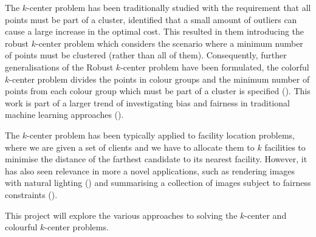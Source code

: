 The $k$-center problem has been traditionally studied with the requirement that all points must be part of a cluster, \textcite{charikar_algorithms_2001} identified that a small amount of outliers can cause a large increase in the optimal cost. This resulted in them introducing the robust $k$-center problem which considers the scenario where a minimum number of points must be clustered (rather than all of them). Consequently, further generalisations of the Robust $k$-center problem have been formulated, the colorful $k$-center problem divides the points in colour groups and the minimum number of points from each colour group which must be part of a cluster is specified (\cite{bandyapadhyay_constant_2019}). This work is part of a larger trend of investigating bias and fairness in traditional machine learning approaches (\cite{mehrabi_survey_2019, anegg_technique_2020}).

The $k$-center problem has been typically applied to facility location problems, where we are given a set of clients and we have to allocate them to $k$ facilities to minimise the distance of the farthest candidate to its nearest facility. However, it has also seen relevance in more a novel applications, such as rendering images with natural lighting (\cite{agarwal_structured_2003}) and summarising a collection of images subject to fairness constraints (\cite{kleindessner_fair_2019}).

This project will explore the various approaches to solving the $k$-center and colourful $k$-center problems.

%